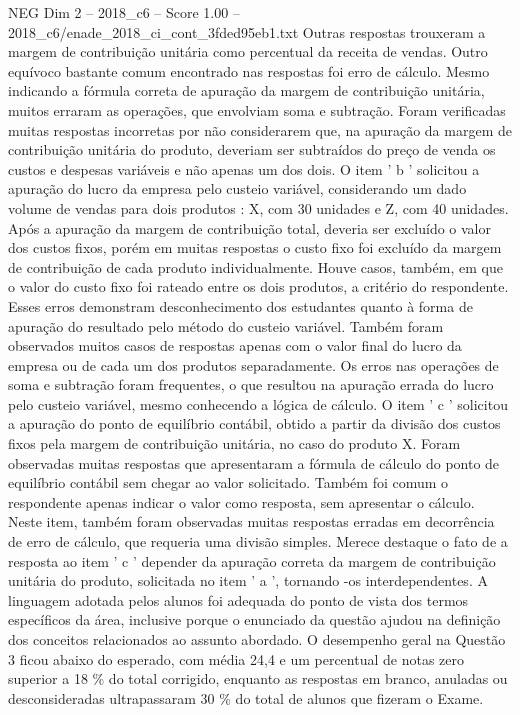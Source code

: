 \begin{textsample}{NEG Dim 2 – 2018\_c6 – Score 1.00 – 2018\_c6/enade\_2018\_ci\_cont\_3fded95eb1.txt}
Outras respostas trouxeram a margem de contribuição unitária como percentual da receita de vendas.
Outro equívoco bastante comum encontrado nas respostas foi erro de cálculo.
Mesmo indicando a fórmula correta de apuração da margem de contribuição unitária, muitos erraram as operações, que envolviam soma e subtração.
Foram verificadas muitas respostas incorretas por não considerarem que, na apuração da margem de contribuição unitária do produto, deveriam ser subtraídos do preço de venda os custos e despesas variáveis e não apenas um dos dois.
O item ' b ' solicitou a apuração do lucro da empresa pelo custeio variável, considerando um dado volume de vendas para dois produtos : X, com 30 unidades e Z, com 40 unidades.
Após a apuração da margem de contribuição total, deveria ser excluído o valor dos custos fixos, porém em muitas respostas o custo fixo foi excluído da margem de contribuição de cada produto individualmente.
Houve casos, também, em que o valor do custo fixo foi rateado entre os dois produtos, a critério do respondente.
Esses erros demonstram desconhecimento dos estudantes quanto à forma de apuração do resultado pelo método do custeio variável.
Também foram observados muitos casos de respostas apenas com o valor final do lucro da empresa ou de cada um dos produtos separadamente.
Os erros nas operações de soma e subtração foram frequentes, o que resultou na apuração errada do lucro pelo custeio variável, mesmo conhecendo a lógica de cálculo.
O item ' c ' solicitou a apuração do ponto de equilíbrio contábil, obtido a partir da divisão dos custos fixos pela margem de contribuição unitária, no caso do produto X.
Foram observadas muitas respostas que apresentaram a fórmula de cálculo do ponto de equilíbrio contábil sem chegar ao valor solicitado.
Também foi comum o respondente apenas indicar o valor como resposta, sem apresentar o cálculo.
Neste item, também foram observadas muitas respostas erradas em decorrência de erro de cálculo, que requeria uma divisão simples.
Merece destaque o fato de a resposta ao item ’ c ’ depender da apuração correta da margem de contribuição unitária do produto, solicitada no item ' a ', tornando -os interdependentes.
A linguagem adotada pelos alunos foi adequada do ponto de vista dos termos específicos da área, inclusive porque o enunciado da questão ajudou na definição dos conceitos relacionados ao assunto abordado.
O desempenho geral na Questão 3 ficou abaixo do esperado, com média 24,4 e um percentual de notas zero superior a 18 \% do total corrigido, enquanto as respostas em branco, anuladas ou desconsideradas ultrapassaram 30 \% do total de alunos que fizeram o Exame.

\end{textsample}

